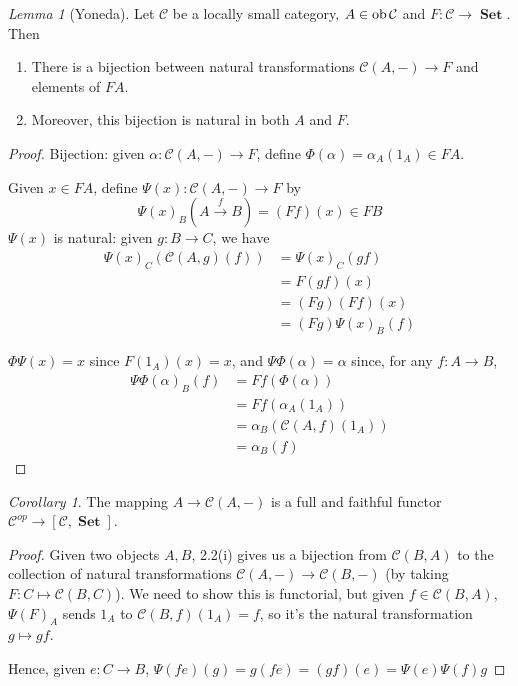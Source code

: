 \documentclass[a4paper]{article}
\theoremstyle{definition}
\theoremstyle{remark}
\theoremstyle{default}
\newtheorem{lemma}[definition]{Lemma}
\newtheorem{corollary}[definition]{Corollary}
\numberwithin{definition}{section}
\newcommand*\ob[1]{\textnormal{ob}\,#1}
\DeclareMathOperator{\Set}{\textbf{Set}}
\begin{document}
\begin{lemma}[Yoneda]
	Let $\mathcal{C}$ be a locally small category, $A \in \ob \mathcal{C}$ and $F: \mathcal{C} \to \Set$. Then
	\begin{enumerate}[label=\roman*.]
		\item There is a bijection between natural transformations $\mathcal{C}(A, -) \to F$ and elements of $FA$.
		\item Moreover, this bijection is natural in both $A$ and $F$.
	\end{enumerate}
\end{lemma}
\begin{proof}
	Bijection: given $\alpha : \mathcal{C}(A, -) \to F$, define $\Phi(\alpha) = \alpha_A(1_A) \in FA$.
	
	Given $x \in FA$, define $\Psi(x): \mathcal{C}(A, -) \to F$ by $$\Psi(x)_B(A \overset{f}{\to} B) = (Ff)(x) \in FB$$ $\Psi(x)$ is natural: given $g: B \to C$, we have
	\begin{align*}
	\Psi(x)_C(\mathcal{C}(A, g)(f)) &= \Psi(x)_C(gf) \\
	&= F(gf)(x) \\
	&= (Fg)(Ff)(x) \\
	&= (Fg)\Psi(x)_B(f)
	\end{align*}
	
	$\Phi\Psi(x) = x$ since $F(1_A)(x) = x$, and $\Psi\Phi(\alpha) = \alpha$ since, for any $f: A \to B$,
	\begin{align*}
	\Psi\Phi(\alpha)_B(f) &= Ff(\Phi(\alpha)) \\
	&= Ff(\alpha_A(1_A)) \\
	&= \alpha_B(\mathcal{C}(A,f)(1_A)) \\
	&= \alpha_B(f)
	\end{align*}
\end{proof}

\begin{corollary}
	The mapping $A \to \mathcal{C}(A, -)$ is a full and faithful functor $\mathcal{C}^{op} \to [\mathcal{C}, \Set]$.
\end{corollary}
\begin{proof}
	Given two objects $A,B$, 2.2(i) gives us a bijection from $\mathcal{C}(B,A)$ to the collection of natural transformations $\mathcal{C}(A, -) \to \mathcal{C}(B, -)$ (by taking $F: C \mapsto \mathcal{C}(B, C)$).
	We need to show this is functorial, but given $f \in \mathcal{C}(B, A)$, $\Psi(F)_A$ sends $1_A$ to $\mathcal{C}(B, f)(1_A) = f$, so it's the natural transformation $g \mapsto gf$.
	
	Hence, given $e: C \to B$, $\Psi(fe)(g) = g(fe) = (gf)(e) = \Psi(e)\Psi(f)g$
\end{proof}
\end{document}
